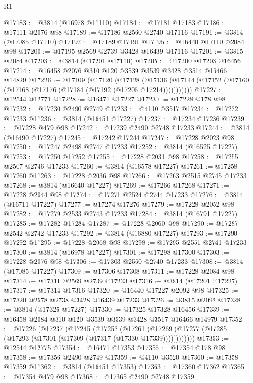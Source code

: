 \begin{lexlean}{R1}
\begin{coremodule}
@17183 := @3814 (@16978 @17110)
@17184 := @17181 @17183
@17186 := @17111 @2076 @98
@17189 := @17186 @2560 @2740 @17116
@17191 := @3814 (@17085 @17110)
@17192 := @17189 @17191
@17195 := @16440 @17110 @2084 @98
@17200 := @17195 @2569 @2739 @3428 @16439 @17116
@17201 := @3815 @2084
@17203 := @3814 (@17201 @17110)
@17205 := @17200 @17203 @16456
@17214 := @16458 @2076 @310 @120 @3539 @3539 @3428 @3514 @16466 @14829
@17226 := @17109
    (@17120
      (@17128
        (@17136 (@17144 (@17152 (@17160 (@17168 (@17176 (@17184 (@17192 (@17205 @17214)))))))))))
@17227 := @12544 @12771
@17228 := @16471 @17227
@17230 := @17228 @178 @98
@17232 := @17230 @2490 @2749
@17233 := @4110 @3517
@17234 := @17232 @17233
@17236 := @3814 (@16451 @17227)
@17237 := @17234 @17236
@17239 := @17228 @479 @98
@17242 := @17239 @2490 @2748 @17233
@17244 := @3814 (@16490 @17227)
@17245 := @17242 @17244
@17247 := @17228 @2023 @98
@17250 := @17247 @2498 @2747 @17233
@17252 := @3814 (@16525 @17227)
@17253 := @17250 @17252
@17255 := @17228 @2031 @98
@17258 := @17255 @2507 @2746 @17233
@17260 := @3814 (@16578 @17227)
@17261 := @17258 @17260
@17263 := @17228 @2036 @98
@17266 := @17263 @2515 @2745 @17233
@17268 := @3814 (@16640 @17227)
@17269 := @17266 @17268
@17271 := @17228 @2044 @98
@17274 := @17271 @2524 @2744 @17233
@17276 := @3814 (@16711 @17227)
@17277 := @17274 @17276
@17279 := @17228 @2052 @98
@17282 := @17279 @2533 @2743 @17233
@17284 := @3814 (@16791 @17227)
@17285 := @17282 @17284
@17287 := @17228 @2060 @98
@17290 := @17287 @2542 @2742 @17233
@17292 := @3814 (@16880 @17227)
@17293 := @17290 @17292
@17295 := @17228 @2068 @98
@17298 := @17295 @2551 @2741 @17233
@17300 := @3814 (@16978 @17227)
@17301 := @17298 @17300
@17303 := @17228 @2076 @98
@17306 := @17303 @2560 @2740 @17233
@17308 := @3814 (@17085 @17227)
@17309 := @17306 @17308
@17311 := @17228 @2084 @98
@17314 := @17311 @2569 @2739 @17233
@17316 := @3814 (@17201 @17227)
@17317 := @17314 @17316
@17320 := @16440 @17227 @2092 @98
@17325 := @17320 @2578 @2738 @3428 @16439 @17233
@17326 := @3815 @2092
@17328 := @3814 (@17326 @17227)
@17330 := @17325 @17328 @16456
@17339 := @16458 @2084 @310 @120 @3539 @3539 @3428 @3517 @16466 @14979
@17352 := @17226
    (@17237
      (@17245
        (@17253
          (@17261 (@17269 (@17277 (@17285 (@17293 (@17301 (@17309 (@17317 (@17330 @17339))))))))))))
@17353 := @12544 @12775
@17354 := @16471 @17353
@17356 := @17354 @178 @98
@17358 := @17356 @2490 @2749
@17359 := @4110 @3520
@17360 := @17358 @17359
@17362 := @3814 (@16451 @17353)
@17363 := @17360 @17362
@17365 := @17354 @479 @98
@17368 := @17365 @2490 @2748 @17359

\end{coremodule}
\end{lexlean}
